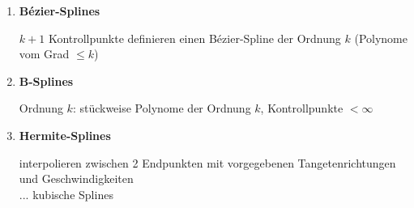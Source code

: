 \begin{enumerate}
\item \textbf{Bézier-Splines}
	\begin{center}
	\end{center}
	$k+1$ Kontrollpunkte definieren einen Bézier-Spline der Ordnung $k$ (Polynome vom Grad $\le k$)
\item \textbf{$\boldsymbol{B}$-Splines}
	\begin{center}
	\end{center}
	Ordnung $k$: stückweise Polynome der Ordnung $k$, Kontrollpunkte $< \infty$
\item \textbf{Hermite-Splines}
	\begin{center}
	\end{center}
	interpolieren zwischen 2 Endpunkten mit vorgegebenen Tangetenrichtungen und Geschwindigkeiten\\
	$...$ kubische Splines
	\begin{center}
	\end{center}

\end{enumerate}